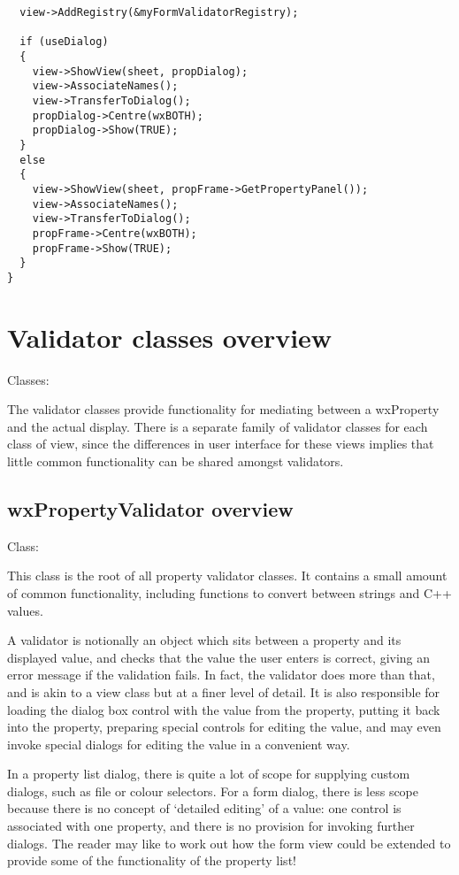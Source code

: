 \begin{verbatim}
  view->AddRegistry(&myFormValidatorRegistry);

  if (useDialog)
  {
    view->ShowView(sheet, propDialog);
    view->AssociateNames();
    view->TransferToDialog();
    propDialog->Centre(wxBOTH);
    propDialog->Show(TRUE);
  }
  else
  {
    view->ShowView(sheet, propFrame->GetPropertyPanel());
    view->AssociateNames();
    view->TransferToDialog();
    propFrame->Centre(wxBOTH);
    propFrame->Show(TRUE);
  }
}
\end{verbatim}

\section{Validator classes overview}\label{validatoroverview}

Classes: 

The validator classes provide functionality for mediating between a wxProperty and
the actual display. There is a separate family of validator classes for each
class of view, since the differences in user interface for these views implies
that little common functionality can be shared amongst validators.

\subsection{wxPropertyValidator overview}\label{wxpropertyvalidatoroverview}

Class: 

This class is the root of all property validator classes. It contains a small
amount of common functionality, including functions to convert between
strings and C++ values.

A validator is notionally an object which sits between a property and its displayed
value, and checks that the value the user enters is correct, giving an error message
if the validation fails. In fact, the validator does more than that, and is akin to
a view class but at a finer level of detail. It is also responsible for
loading the dialog box control with the value from the property, putting it back
into the property, preparing special controls for editing the value, and
may even invoke special dialogs for editing the value in a convenient way.

In a property list dialog, there is quite a lot of scope for supplying custom dialogs,
such as file or colour selectors. For a form dialog, there is less scope because
there is no concept of `detailed editing' of a value: one control is associated with
one property, and there is no provision for invoking further dialogs. The reader
may like to work out how the form view could be extended to provide some of the
functionality of the property list!

